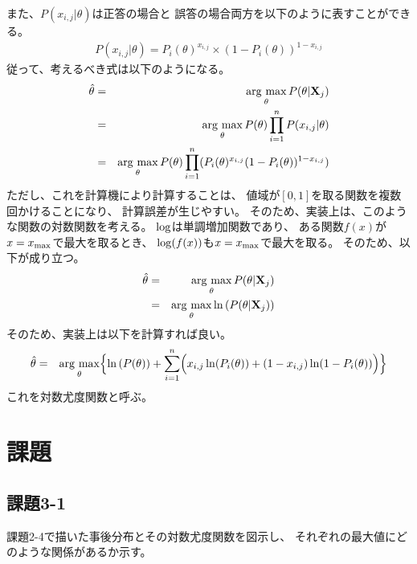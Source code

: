 \documentclass[12pt]{jarticle}
\begin{document}
また、$P(x_{i,j}|\theta)$は正答の場合と
誤答の場合両方を以下のように表すことができる。
\begin{eqnarray}
    P(x_{i,j}|\theta)=P_i(\theta)^{x_{i,j}}\times (1-P_i(\theta))^{1-x_{i,j}}
\end{eqnarray}
従って、考えるべき式は以下のようになる。
\begin{eqnarray}
    \hat{\theta}&=& \mathop{\rm arg~max}\limits_{\theta} P(\theta|{\bf X}_j) \nonumber\\
    &=& \mathop{\rm arg~max}\limits_{\theta} P(\theta)\prod_{i=1}^n P(x_{i,j}|\theta) \nonumber\\
    &=& \mathop{\rm arg~max}\limits_{\theta} P(\theta)\prod_{i=1}^n (P_i(\theta)^{x_{i,j}}(1-P_i(\theta))^{1-x_{i,j}})
\end{eqnarray}
ただし、これを計算機により計算することは、
値域が$[0,1]$を取る関数を複数回かけることになり、
計算誤差が生じやすい。
そのため、実装上は、このような関数の対数関数を考える。
${\rm log}$は単調増加関数であり、
ある関数$f(x)$が$x=x_{\rm max}$で最大を取るとき、
${\rm log}(f(x))$も$x=x_{\rm max}$で最大を取る。
そのため、以下が成り立つ。
\begin{eqnarray}
    \hat{\theta}&=& \mathop{\rm arg~max}\limits_{\theta} P(\theta|{\bf X}_j)\\
    &=& \mathop{\rm arg~max}\limits_{\theta} \ln{(P(\theta|{\bf X}_j))}
\end{eqnarray}
そのため、実装上は以下を計算すれば良い。
\begin{eqnarray}
    \hat{\theta}&=& \mathop{\rm arg~max}\limits_{\theta} \Bigl\{\ln{(P(\theta))
    +\sum_{i=1}^n \Bigl(x_{i,j}\ln(P_i(\theta))+(1-x_{i,j})\ln(1-P_i(\theta))\Bigr)}\Bigr\}
\end{eqnarray}
これを対数尤度関数と呼ぶ。

\clearpage
\section{課題}
\subsection{課題3-1}
\begin{shadebox}
    課題2-4で描いた事後分布とその対数尤度関数を図示し、
    それぞれの最大値にどのような関係があるか示す。
\end{shadebox}
\end{document}
